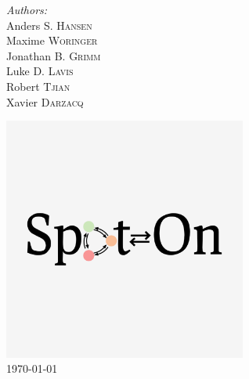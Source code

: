 \begin{titlepage}
\emph{Authors:}\\
Anders S. \textsc{Hansen}\\ %
Maxime \textsc{Woringer}\\ %
Jonathan B. \textsc{Grimm}\\
Luke D. \textsc{Lavis}\\
Robert \textsc{Tjian}\\
Xavier \textsc{Darzacq}
\vfill



\includegraphics[width=8cm]{../logo/spoton_logo_square.png}\\[0.3cm] %


{\large \today}\\[0.3cm] %



\vfill %

\end{titlepage}



